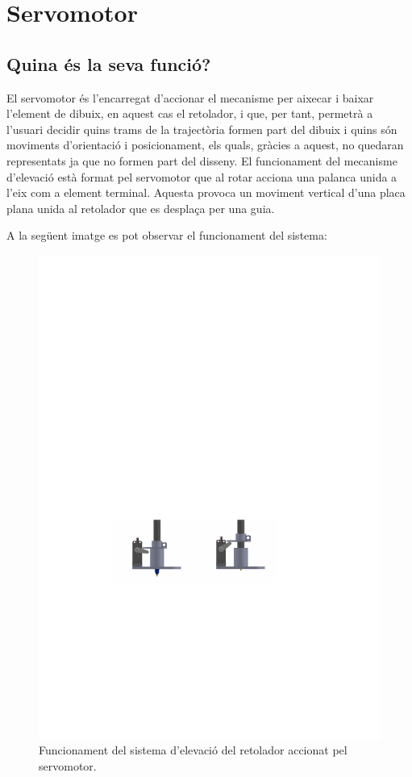 \section {Servomotor}

\subsection{Quina és la seva funció?}

El servomotor és l’encarregat d’accionar el mecanisme per aixecar i baixar l’element de dibuix, en aquest cas el retolador, i que, per tant, permetrà a l’usuari decidir quins trams de la trajectòria formen part del dibuix i quins són moviments d’orientació i posicionament, els quals, gràcies a aquest, no quedaran representats ja que no formen part del disseny. El funcionament del mecanisme d’elevació està format pel servomotor que al rotar acciona una palanca unida a l'eix com a element terminal. Aquesta provoca un moviment vertical d’una placa plana unida al retolador que es desplaça per una guia.  

A la següent imatge es pot observar el funcionament del sistema:

\begin{figure}[H]
	\centering
	\includegraphics{elevacio}
	\caption{Funcionament del sistema d'elevació del retolador accionat pel servomotor.}
	\label{fig:elevacio}
\end{figure}

